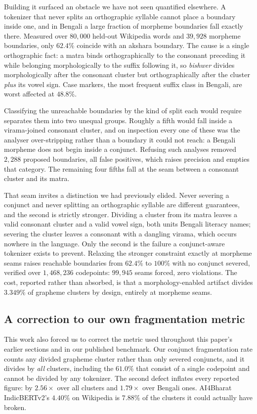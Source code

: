\documentclass[11pt]{article}
\begin{document}
Building it surfaced an obstacle we have not seen quantified elsewhere. A
tokenizer that never splits an orthographic syllable cannot place a boundary
inside one, and in Bengali a large fraction of morpheme boundaries fall
exactly there. Measured over $80{,}000$ held-out Wikipedia words and
$39{,}928$ morpheme boundaries, only $62.4\%$ coincide with an akshara
boundary. The cause is a single orthographic fact: a matra binds
orthographically to the consonant preceding it while belonging
morphologically to the suffix following it, so \emph{bishwer} divides
morphologically after the consonant cluster but orthographically after the
cluster \emph{plus} its vowel sign. Case markers, the most frequent suffix
class in Bengali, are worst affected at $48.8\%$.

Classifying the unreachable boundaries by the kind of split each would
require separates them into two unequal groups. Roughly a fifth would fall
inside a virama-joined consonant cluster, and on inspection every one of
these was the analyser over-stripping rather than a boundary it could not
reach: a Bengali morpheme does not begin inside a conjunct. Refusing such
analyses removed $2{,}288$ proposed boundaries, all false positives, which
raises precision and empties that category. The remaining four fifths fall
at the seam between a consonant cluster and its matra.

That seam invites a distinction we had previously elided. Never severing a
conjunct and never splitting an orthographic syllable are different
guarantees, and the second is strictly stronger. Dividing a cluster from its
matra leaves a valid consonant cluster and a valid vowel sign, both units
Bengali literacy names; severing the cluster leaves a consonant with a
dangling virama, which occurs nowhere in the language. Only the second is
the failure a conjunct-aware tokenizer exists to prevent. Relaxing the
stronger constraint exactly at morpheme seams raises reachable boundaries
from $62.4\%$ to $100\%$ with no conjunct severed, verified over $1{,}468{,}236$
codepoints: $99{,}945$ seams forced, zero violations. The cost, reported
rather than absorbed, is that a morphology-enabled artifact divides $3.349\%$
of grapheme clusters by design, entirely at morpheme seams.

\subsection{A correction to our own fragmentation metric}

This work also forced us to correct the metric used throughout this paper's
earlier sections and in our published benchmark. Our conjunct fragmentation
rate counts any divided grapheme cluster rather than only severed conjuncts,
and it divides by \emph{all} clusters, including the $61.0\%$ that consist of
a single codepoint and cannot be divided by any tokenizer. The second defect
inflates every reported figure: by $2.56\times$ over all clusters and
$1.79\times$ over Bengali ones. AI4Bharat IndicBERTv2's $4.40\%$ on Wikipedia
is $7.88\%$ of the clusters it could actually have broken.
\end{document}
